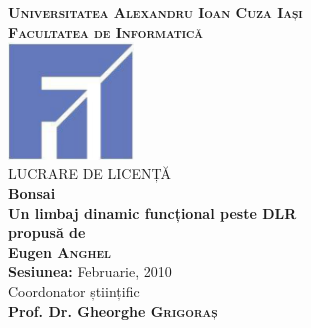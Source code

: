 \documentclass[12pt,a4paper]{article}
\begin{document}
\thispagestyle{empty}
\centering

\vspace*{-4cm}
\textbf{\textsc{\Large{Universitatea Alexandru Ioan Cuza Iași\\Facultatea de Informatică\\}}}
\vspace*{3cm}
\includegraphics[width=0.25\textwidth]{./fii_logo.png}
\\[3cm]
\Huge{LUCRARE DE LICENȚĂ}
\\[1cm]
\textbf{\Huge{Bonsai}\\\LARGE{Un limbaj dinamic funcțional peste DLR}}
\\[1cm]
\textbf{\large{{propusă de}}}
\\[1cm]
\textbf{\Large{Eugen \textsc{Anghel}}}
\\[1cm]
\Large{\textbf{Sesiunea:} Februarie, 2010}
\\[1cm]
Coordonator științific\\
\textbf{Prof. Dr. Gheorghe \textsc{Grigoraș}}
\end{document}
